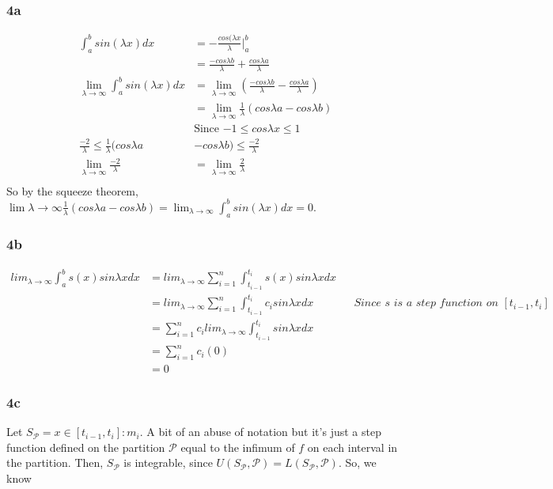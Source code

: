 \documentclass{article}
\newcommand{\sfunc}{S_{\mathcal{P}}}
\begin{document}
\subsubsection*{4a}
\begin{align*}
	\int_{a}^{b}sin(\lambda x) dx &= -\frac{cos(\lambda x}{\lambda}|^{b}_{a}\\
	&= \frac{-cos \lambda b}{\lambda} + \frac{cos \lambda a}{\lambda}\\
	\lim_{\lambda \rightarrow \infty} \int_{a}^{b}sin(\lambda x) dx &=  \lim_{\lambda \rightarrow \infty} (\frac{-cos \lambda b}{\lambda} - \frac{cos \lambda a}{\lambda})\\
	&=\lim_{\lambda \rightarrow \infty} \frac{1}{\lambda} (cos \lambda a - cos \lambda b)\\
	&\text{Since $-1 \leq cos \lambda x \leq 1$}\\
	\frac{-2}{\lambda} \leq \frac{1}{\lambda}(cos \lambda a &- cos \lambda b) \leq \frac{-2}{\lambda}\\
	\lim_{\lambda \rightarrow \infty} \frac{-2}{\lambda} &= \lim_{\lambda \rightarrow \infty} \frac{2}{\lambda}\\ 
\end{align*}
So by the squeeze theorem, $\lim{\lambda \rightarrow \infty} \frac{1}{\lambda} (cos \lambda a - cos \lambda b) = \lim_{\lambda \rightarrow \infty} \int_{a}^{b}sin(\lambda x) dx = 0$.
\subsubsection*{4b}
\begin{align*}
lim_{\lambda \rightarrow \infty} \int_{a}^{b}s(x)sin\lambda x dx &= lim_{\lambda \rightarrow \infty} \sum_{i=1}^{n} \int_{t_{i-1}}^{t_{i}}s(x)sin\lambda x dx\\
&= lim_{\lambda \rightarrow \infty} \sum_{i=1}^{n} \int_{t_{i-1}}^{t_{i}}c_{i}sin\lambda x dx  && \textit{Since $s$ is a step function on $[t_{i-1}, t_{i}]$}\\
&= \sum_{i=1}^{n} c_{i} lim_{\lambda \rightarrow \infty}  \int_{t_{i-1}}^{t_{i}}sin\lambda x dx\\
&= \sum_{i=1}^{n} c_{i}(0)\\
&= 0
\end{align*}
\subsubsection*{4c}
Let $S_{\mathcal{P}} = x \in [t_{i-1}, t_{i}]: m_{i}$. A bit of an abuse of notation but it's just a step function defined on the partition $\mathcal{P}$ equal to the infimum of $f$ on each interval in the partition. Then, $\sfunc$ is integrable, since $U(\sfunc, \mathcal{P}) = L(\sfunc, \mathcal{P})$. So, we know 
\end{document}
